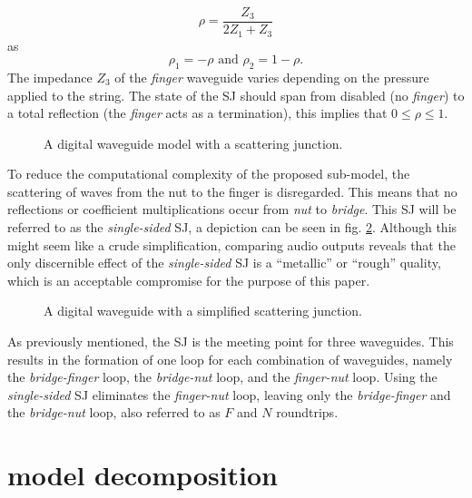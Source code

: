 \documentclass{sigchi}
\begin{document}
\begin{equation} \label{eq:rho}
	\rho=\frac{Z_3}{2Z_1+Z_3}
\end{equation}
as
\begin{equation}
	\rho_1=-\rho \text{ and } \rho_2=1-\rho.
\end{equation}
The impedance $Z_3$ of the \textit{finger} waveguide varies depending on the pressure applied to the string. The state of the SJ should span from disabled (no \textit{finger}) to a total reflection (the \textit{finger} acts as a termination),  this implies that $0 \leq \rho \leq 1$.

\begin{figure}[h]
	\centering
	\scalebox{0.56}{}
	\caption{A digital waveguide model with a scattering junction.}
	\label{fig:waveguide_sj}
\end{figure}

To reduce the computational complexity of the proposed sub-model, the scattering of waves from the nut to the finger is disregarded. This means that no reflections or coefficient multiplications occur from \textit{nut} to \textit{bridge}. This SJ will be referred to as the \textit{single-sided} SJ, a depiction can be seen in fig. \ref{fig:waveguide_simple_sj}. Although this might seem like a crude simplification, comparing audio outputs reveals that the only discernible effect of the \textit{single-sided} SJ is a ``metallic'' or ``rough'' quality, which is an acceptable compromise for the purpose of this paper.
\begin{figure}[h]
	\centering
	\scalebox{0.6}{}
	\caption{A digital waveguide with a simplified scattering junction.}
	\label{fig:waveguide_simple_sj}
\end{figure}

As previously mentioned, the SJ is the meeting point for three waveguides. This results in the formation of one loop for each combination of waveguides, namely the \textit{bridge-finger} loop, the \textit{bridge-nut} loop, and the \textit{finger-nut} loop. Using the \textit{single-sided} SJ eliminates the \textit{finger-nut} loop, leaving only the \textit{bridge-finger} and the \textit{bridge-nut} loop, also referred to as $F$ and $N$ roundtrips.

\section{model decomposition}
\end{document}
